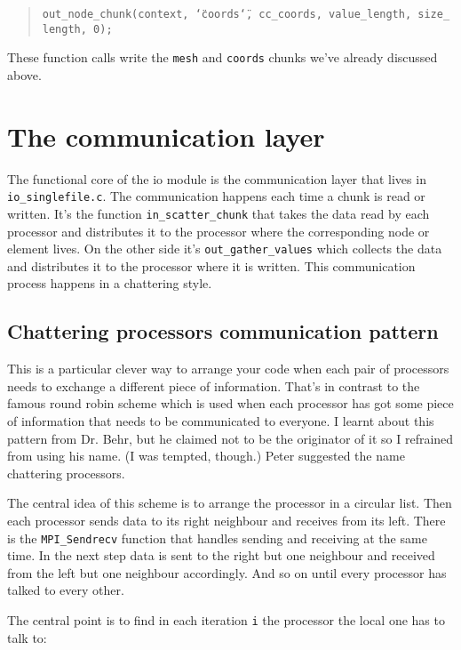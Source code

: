\begin{quote}
\texttt{out{\_}node{\_}chunk(context,~\char`\"{}coords\char`\"{},~cc{\_}coords,~value{\_}length,~size{\_}length,~0); }
\end{quote}
These function calls write the \texttt{mesh} and \texttt{coords} chunks
we've already discussed above.


\section{The communication layer}

The functional core of the io module is the communication layer that
lives in \texttt{io{\_}singlefile.c}. The communication happens
each time a chunk is read or written. It's the function \texttt{in{\_}scatter{\_}chunk}
that takes the data read by each processor and distributes it to the
processor where the corresponding node or element lives. On the other
side it's \texttt{out{\_}gather{\_}values} which collects the
data and distributes it to the processor where it is written. This
communication process happens in a chattering style.


\subsection{Chattering processors communication pattern}

This is a particular clever way to arrange your code when each pair
of processors needs to exchange a different piece of information.
That's in contrast to the famous round robin scheme which is used
when each processor has got some piece of information that needs to
be communicated to everyone. I learnt about this pattern from Dr.
Behr, but he claimed not to be the originator of it so I refrained
from using his name. (I was tempted, though.) Peter suggested the
name chattering processors.

The central idea of this scheme is to arrange the processor in a circular
list. Then each processor sends data to its right neighbour and receives
from its left. There is the \texttt{MPI{\_}Sendrecv} function that
handles sending and receiving at the same time. In the next step data
is sent to the right but one neighbour and received from the left
but one neighbour accordingly. And so on until every processor has
talked to every other.

The central point is to find in each iteration \texttt{i} the processor
the local one has to talk to: 

